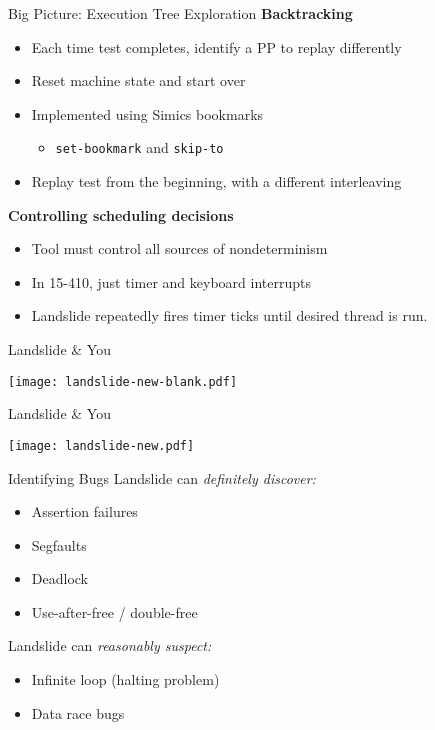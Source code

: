 \documentclass[xcolor=dvipsnames]{beamer}
\begin{document}
\begin{frame}{Big Picture: Execution Tree Exploration}
	\textbf{Backtracking}
	\begin{itemize}
		\item Each time test completes, identify a PP to replay differently
		\item Reset machine state and start over
		\item Implemented using Simics bookmarks
			\begin{itemize}
				\item {\tt set-bookmark} and {\tt skip-to}
			\end{itemize}
		\item Replay test from the beginning, with a different interleaving
	\end{itemize}
	\pause
	\linegap

	{\bf Controlling scheduling decisions}
	\begin{itemize}
		\item Tool must control all sources of nondeterminism
		\item In 15-410, just timer and keyboard interrupts
		\item Landslide repeatedly fires timer ticks until desired thread is run.
	\end{itemize}
\end{frame}

\begin{frame}{Landslide \& You}
	\begin{center}
	\texttt{[image: landslide-new-blank.pdf]}
	\end{center}
\end{frame}

\begin{frame}{Landslide \& You}
	\begin{center}
	\texttt{[image: landslide-new.pdf]}
	\end{center}
\end{frame}

\begin{frame}{Identifying Bugs}
	Landslide can {\em definitely discover:}
	\begin{itemize}
		\item Assertion failures %
		\item Segfaults
		\item Deadlock
		\item Use-after-free / double-free
	\end{itemize}
	\linegap
	Landslide can {\em reasonably suspect:}
	\begin{itemize}
		\item Infinite loop (halting problem)
		\item Data race bugs
	\end{itemize}
\end{frame}
\end{document}
